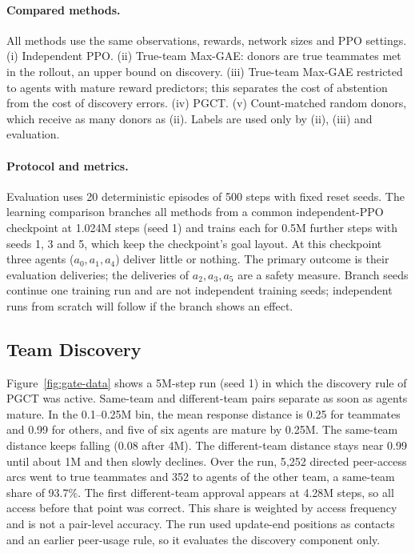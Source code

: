 \documentclass{article}
\begin{document}
\paragraph{Compared methods.} All methods use the same observations, rewards, network sizes and PPO settings. (i) Independent PPO. (ii) True-team Max-GAE: donors are true teammates met in the rollout, an upper bound on discovery. (iii) True-team Max-GAE restricted to agents with mature reward predictors; this separates the cost of abstention from the cost of discovery errors. (iv) PGCT. (v) Count-matched random donors, which receive as many donors as (ii). Labels are used only by (ii), (iii) and evaluation.

\paragraph{Protocol and metrics.} Evaluation uses 20 deterministic episodes of 500 steps with fixed reset seeds. The learning comparison branches all methods from a common independent-PPO checkpoint at 1.024M steps (seed 1) and trains each for 0.5M further steps with seeds 1, 3 and 5, which keep the checkpoint's goal layout. At this checkpoint three agents ($a_0,a_1,a_4$) deliver little or nothing. The primary outcome is their evaluation deliveries; the deliveries of $a_2,a_3,a_5$ are a safety measure. Branch seeds continue one training run and are not independent training seeds; independent runs from scratch will follow if the branch shows an effect.

\subsection{Team Discovery}\label{sec:discovery}
Figure~\ref{fig:gate-data} shows a 5M-step run (seed 1) in which the discovery rule of PGCT was active. Same-team and different-team pairs separate as soon as agents mature. In the 0.1--0.25M bin, the mean response distance is 0.25 for teammates and 0.99 for others, and five of six agents are mature by 0.25M. The same-team distance keeps falling (0.08 after 4M). The different-team distance stays near 0.99 until about 1M and then slowly declines. Over the run, 5{,}252 directed peer-access arcs went to true teammates and 352 to agents of the other team, a same-team share of 93.7\%. The first different-team approval appears at 4.28M steps, so all access before that point was correct. This share is weighted by access frequency and is not a pair-level accuracy. The run used update-end positions as contacts and an earlier peer-usage rule, so it evaluates the discovery component only.
\end{document}
